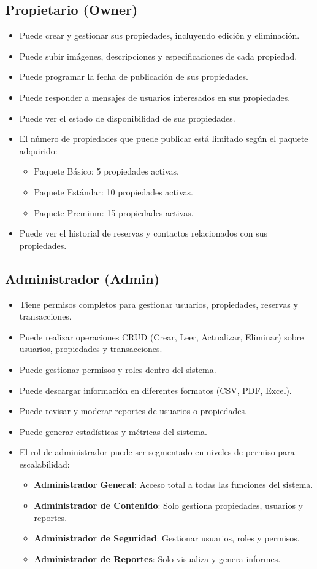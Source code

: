 	\subsection*{Propietario (Owner)}
		\begin{itemize}
			\item Puede crear y gestionar sus propiedades, incluyendo edición y eliminación.
			\item Puede subir imágenes, descripciones y especificaciones de cada propiedad.
			\item Puede programar la fecha de publicación de sus propiedades.
			\item Puede responder a mensajes de usuarios interesados en sus propiedades.
			\item Puede ver el estado de disponibilidad de sus propiedades.
			\item El número de propiedades que puede publicar está limitado según el paquete adquirido:
			\begin{itemize}
				\item Paquete Básico: 5 propiedades activas.
				\item Paquete Estándar: 10 propiedades activas.
				\item Paquete Premium: 15 propiedades activas.
			\end{itemize}
			\item Puede ver el historial de reservas y contactos relacionados con sus propiedades.
		\end{itemize}
	
	\subsection*{Administrador (Admin)}
		\begin{itemize}
			\item Tiene permisos completos para gestionar usuarios, propiedades, reservas y transacciones.
			\item Puede realizar operaciones CRUD (Crear, Leer, Actualizar, Eliminar) sobre usuarios, propiedades y transacciones.
			\item Puede gestionar permisos y roles dentro del sistema.
			\item Puede descargar información en diferentes formatos (CSV, PDF, Excel).
			\item Puede revisar y moderar reportes de usuarios o propiedades.
			\item Puede generar estadísticas y métricas del sistema.
			\item El rol de administrador puede ser segmentado en niveles de permiso para escalabilidad:
			\begin{itemize}
				\item \textbf{Administrador General}: Acceso total a todas las funciones del sistema.
				\item \textbf{Administrador de Contenido}: Solo gestiona propiedades, usuarios y reportes.
				\item \textbf{Administrador de Seguridad}: Gestionar usuarios, roles y permisos.
				\item \textbf{Administrador de Reportes}: Solo visualiza y genera informes.
			\end{itemize}
	\end{itemize}